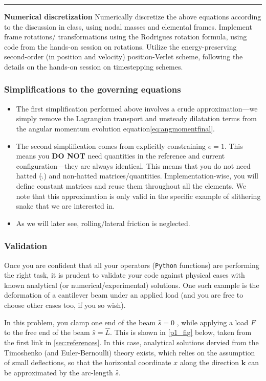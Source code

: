 \documentclass[11pt]{article}
\begin{document}
\noindent\rule{1\textwidth}{0.01pt}

\noindent \textbf{Numerical discretization}
Numerically discretize the above equations according to the discussion in
class, using nodal masses and elemental frames. Implement frame rotations/
transformations using the Rodrigues rotation formula, using code from the
hands-on session on rotations. Utilize the energy-preserving second-order
(in position and velocity) position-Verlet scheme, following the details on
the hands-on session on timestepping schemes.

\subsubsection{Simplifications to the governing equations}
\label{sec:orgb411169}
\begin{itemize}
\item The first simplification performed above involves a crude
approximation---we simply remove the Lagrangian transport and unsteady
dilatation terms from the angular momentum evolution equation\cref{eq:angmomentfinal}.
\item The second simplification comes from explicitly constraining \(e = 1\).
This means you \textbf{DO NOT} need quantities in the reference and current
configuration---they are always identical. This means that you do not
need hatted (\(\hat{.}\)) and non-hatted matrices/quantities.
Implementation-wise, you will define constant matrices and reuse them
throughout all the elements. We note that this approximation is only
valid in the specific example of slithering snake that we are interested in.
\item As we will later see, rolling/lateral friction is neglected.
\end{itemize}
\subsubsection{Validation}
\label{sec:org120c7fa}
Once you are confident that all your operators (\texttt{Python}  functions) are
performing the right task, it is prudent to validate your code against
physical cases with known analytical (or numerical/experimental) solutions.
One such example is the deformation of a cantilever beam under an applied
load (and you are free to choose other cases too, if you so wish).

In this problem, you clamp one end of the beam \(\hat{s}=0\) , while applying a load \(F\) to the free end of the beam \(\hat{s}=\hat{L}\). This is shown in \cref{p1_fig} below, taken
 from the first link in \cref{sec:references}. In this case, analytical solutions dervied from the Timoshenko (and
 Euler-Bernoulli) theory exists, which relies on the assumption of small
 deflections, so that the horizontal coordinate \(x\) along the direction
 \(\mathbf{k}\) can be approximated by the arc-length \(\hat{s}\).
\end{document}
